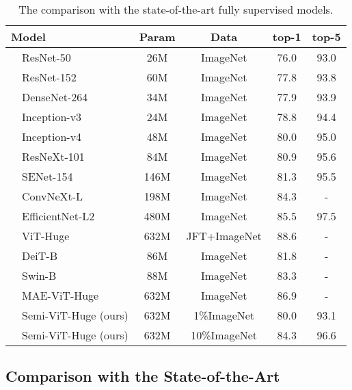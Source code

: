 \documentclass{article}
\begin{document}
\setlength{\tabcolsep}{10pt}
\begin{table}[t]
\begin{center}
\small
\begin{tabular}{llcccc}
\toprule
\multicolumn{2}{l}{Model} &Param &Data & top-1 & top-5 \\\hline
\parbox[t]{2mm}{} &ResNet-50 \cite{DBLP:conf/cvpr/HeZRS16} &26M &ImageNet &76.0 &93.0 \\
&ResNet-152 \cite{DBLP:conf/cvpr/HeZRS16} &60M &ImageNet &77.8 &93.8 \\
&DenseNet-264 \cite{DBLP:conf/cvpr/HuangLMW17} &34M &ImageNet &77.9 &93.9 \\
&Inception-v3 \cite{DBLP:conf/cvpr/SzegedyVISW16} &24M &ImageNet &78.8 &94.4 \\
&Inception-v4 \cite{DBLP:conf/aaai/SzegedyIVA17} &48M &ImageNet &80.0 &95.0 \\
&ResNeXt-101 \cite{DBLP:conf/cvpr/XieGDTH17} &84M &ImageNet &80.9 &95.6 \\
&SENet-154 \cite{DBLP:conf/cvpr/HuSS18} &146M &ImageNet &81.3 &95.5 \\
&ConvNeXt-L \cite{liu2022convnet} &198M &ImageNet &84.3 &- \\
&EfficientNet-L2 \cite{DBLP:conf/icml/TanL19} &480M &ImageNet &85.5 &97.5 \\\hline
\parbox[t]{2mm}{} &ViT-Huge \cite{DBLP:conf/iclr/DosovitskiyB0WZ21} &632M &JFT+ImageNet &88.6 &- \\
&DeiT-B \cite{DBLP:conf/icml/TouvronCDMSJ21}  &86M &ImageNet &81.8 &- \\
&Swin-B \cite{DBLP:conf/iccv/LiuL00W0LG21} &88M &ImageNet &83.3 &- \\
&MAE-ViT-Huge \cite{he2021masked} &632M &ImageNet &86.9 &- \\
&Semi-ViT-Huge (ours) &632M &1\%ImageNet &80.0 &93.1 \\
&Semi-ViT-Huge (ours) &632M &10\%ImageNet &84.3 &96.6 \\
\bottomrule
\end{tabular}
\caption{The comparison with the state-of-the-art fully supervised models.}
\label{tab:full sota}
\end{center}\vspace{-3mm}
\end{table}



\subsection{Comparison with the State-of-the-Art}
\end{document}
